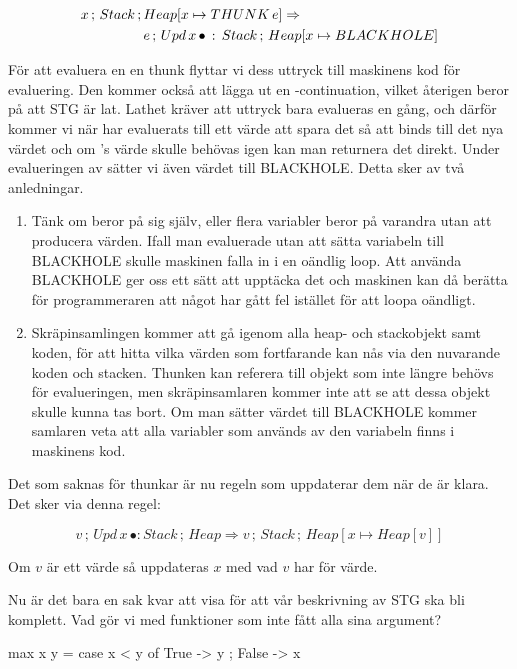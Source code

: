 \documentclass[../Core]{subfiles}
\begin{document}
\begin{align*}
x\,;\, Stack\,;\, & Heap[x\mapsto THUNK\,e] \Rightarrow  \\
 & e\,;\, Upd\, x\,\bullet\,:\, Stack\,;\, Heap[x\mapsto BLACKHOLE]
\end{align*}

För att evaluera en en thunk flyttar vi dess uttryck till maskinens kod
för evaluering. Den kommer också att lägga ut en -continuation, vilket
återigen beror på att STG är lat. Lathet kräver att uttryck bara evalueras
en gång, och därför kommer vi när  har evaluerats till ett värde att spara
det så att  binds till det nya värdet och om 's värde skulle behövas
igen kan man returnera det direkt. Under evalueringen av  sätter
vi även värdet  till BLACKHOLE. Detta sker av två anledningar.
\begin{enumerate}
\item Tänk om  beror på sig själv, eller flera variabler beror på varandra utan
att producera värden. Ifall man evaluerade utan att sätta variabeln till BLACKHOLE
skulle maskinen falla in i en oändlig loop. Att använda BLACKHOLE ger oss ett sätt att
upptäcka det och maskinen kan då berätta för programmeraren att något har gått fel
istället för att loopa oändligt.
\item Skräpinsamlingen kommer att gå igenom alla heap- och stackobjekt
samt koden, för att hitta vilka värden som fortfarande kan nås via den nuvarande
koden och stacken. Thunken kan referera till objekt som inte längre
behövs för evalueringen, men skräpinsamlaren kommer inte att se att dessa objekt skulle
kunna tas bort. Om man sätter värdet till BLACKHOLE
kommer samlaren veta att alla variabler som används av den variabeln finns
i maskinens kod.
\end{enumerate}
Det som saknas för thunkar är nu regeln som uppdaterar dem när de
är klara. Det sker via denna regel:

\[
v\,;\, Upd\, x\,\bullet:Stack\,;\, Heap\Rightarrow v\,;\, Stack\,;\, Heap[x\mapsto Heap[v]]\]

Om $v$ är ett värde så uppdateras $x$ med vad $v$ har för värde.

Nu är det bara en sak kvar att visa för att vår beskrivning av STG ska bli komplett.
Vad gör vi med funktioner som inte fått alla sina argument?

\begin{codeEx}
max x y = case x < y of
    { True  -> y
    ; False -> x
    }
\end{codeEx}
\end{document}

